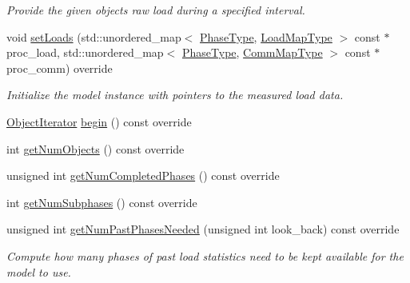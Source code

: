 \begin{DoxyCompactItemize}
\begin{DoxyCompactList}\small\item\em Provide the given object\textquotesingle{}s raw load during a specified interval. \end{DoxyCompactList}\item 
void \hyperlink{structvt_1_1vrt_1_1collection_1_1balance_1_1_raw_data_aa29d4f35b5d3afb4690cef64fb65b887}{set\+Loads} (std\+::unordered\+\_\+map$<$ \hyperlink{namespacevt_a46ce6733d5cdbd735d561b7b4029f6d7}{Phase\+Type}, \hyperlink{namespacevt_1_1vrt_1_1collection_1_1balance_a5339303db2e1ce964d783a53fd74e6b1}{Load\+Map\+Type} $>$ const $\ast$proc\+\_\+load, std\+::unordered\+\_\+map$<$ \hyperlink{namespacevt_a46ce6733d5cdbd735d561b7b4029f6d7}{Phase\+Type}, \hyperlink{namespacevt_1_1vrt_1_1collection_1_1balance_a01ee1fb0ae2da1d2ab7fdca3be9ae351}{Comm\+Map\+Type} $>$ const $\ast$proc\+\_\+comm) override
\begin{DoxyCompactList}\small\item\em Initialize the model instance with pointers to the measured load data. \end{DoxyCompactList}\item 
\hyperlink{structvt_1_1vrt_1_1collection_1_1balance_1_1_object_iterator}{Object\+Iterator} \hyperlink{structvt_1_1vrt_1_1collection_1_1balance_1_1_raw_data_acfe356d51313995dacf50868f3fac19b}{begin} () const override
\item 
int \hyperlink{structvt_1_1vrt_1_1collection_1_1balance_1_1_raw_data_af52829981fa8aec26ac5cfc0a2d29cce}{get\+Num\+Objects} () const override
\item 
unsigned int \hyperlink{structvt_1_1vrt_1_1collection_1_1balance_1_1_raw_data_afc5ca3584a08924a4c5941b32aebb35e}{get\+Num\+Completed\+Phases} () const override
\item 
int \hyperlink{structvt_1_1vrt_1_1collection_1_1balance_1_1_raw_data_a252d51c7265f225736068a4ae87b4a0a}{get\+Num\+Subphases} () const override
\item 
unsigned int \hyperlink{structvt_1_1vrt_1_1collection_1_1balance_1_1_raw_data_ad81a96c22f81405e93bf162e6aafbeed}{get\+Num\+Past\+Phases\+Needed} (unsigned int look\+\_\+back) const override
\begin{DoxyCompactList}\small\item\em Compute how many phases of past load statistics need to be kept available for the model to use. \end{DoxyCompactList}\end{DoxyCompactItemize}
